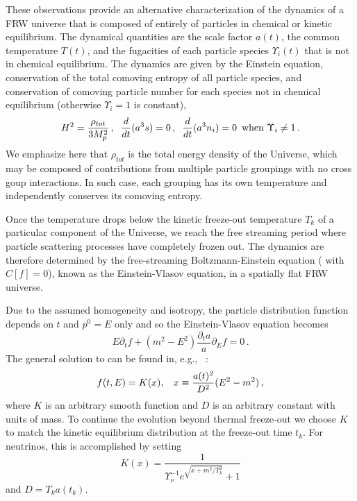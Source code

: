 These observations provide an alternative characterization of the dynamics of a FRW universe that is composed of entirely of particles in chemical or kinetic equilibrium.  The dynamical quantities are the scale factor $a(t)$, the common temperature $T(t)$, and the fugacities of each particle species $\Upsilon_i(t)$ that is not in chemical equilibrium.  The dynamics are given by the Einstein equation, conservation of the total comoving entropy of all particle species, and conservation of comoving particle number for each species not in chemical equilibrium (otherwise $\Upsilon_i=1$ is constant),
\begin{equation}\label{eq_dynamics}
H^2=\frac{\rho_{tot}}{3M_p^2}\,, \hspace{2mm} \frac{d}{dt}(a^3s)=0\,,\hspace{2mm} \frac{d}{dt}(a^3n_i)=0 \,\text{ when } \Upsilon_i\neq 1\,.
\end{equation}
We emphasize here that $\rho_{tot}$ is the total energy density of the Universe, which may be composed of contributions from multiple particle groupings with no cross goup interactions. In such case, each grouping has its own temperature and   independently conserves its comoving entropy. 


Once the temperature drops below the kinetic freeze-out temperature $T_k$ of a particular component of the Universe, we reach  the free streaming period where  particle scattering processes have completely frozen out. The   dynamics are therefore determined by the free-streaming Boltzmann-Einstein equation ( with $C[f]=0$), known as the Einstein-Vlasov equation, in a spatially flat FRW universe.  

Due to the assumed homogeneity and isotropy, the particle distribution function depends on $t$ and $p^0=E$ only and so the Einstein-Vlasov equation becomes
\begin{equation}\label{VEeqFLR}
E\partial_tf+(m^2-E^2)\frac{\partial_ta}{a}\partial_{E}f=0\,.
\end{equation}
The general solution to  can be found in, e.g., ~\cite{Choquet-Bruhat:2009xil,Wong:2011ip}:
\begin{equation}\label{general_sol}
f(t,E)=K(x),\hspace{3mm} x\equiv\frac{a(t)^2}{D^2}(E^2-m^2)\,,
\end{equation}
where $K$ is an arbitrary smooth function and $D$ is an arbitrary constant with units of mass.  To continue the evolution beyond thermal freeze-out  we choose $K$ to match the kinetic equilibrium distribution  at the freeze-out time $t_k$. For neutrinos, this is accomplished by setting
\begin{equation}\label{K_func}
K(x)=\frac{1}{\Upsilon_\nu^{-1}e^{\sqrt{x+m^2/T_k^2}}+ 1}
\end{equation}
and $D=T_k a(t_k)$. 

